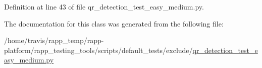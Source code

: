 Definition at line 43 of file qr\-\_\-detection\-\_\-test\-\_\-easy\-\_\-medium.\-py.



The documentation for this class was generated from the following file\-:\begin{DoxyCompactItemize}
\item 
/home/travis/rapp\-\_\-temp/rapp-\/platform/rapp\-\_\-testing\-\_\-tools/scripts/default\-\_\-tests/exclude/\hyperlink{qr__detection__test__easy__medium_8py}{qr\-\_\-detection\-\_\-test\-\_\-easy\-\_\-medium.\-py}\end{DoxyCompactItemize}
